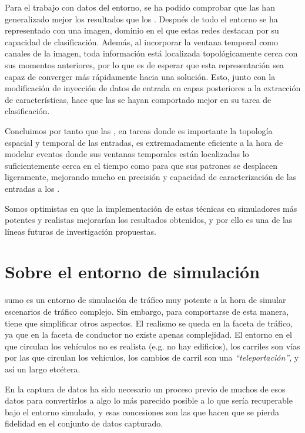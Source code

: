 Para el trabajo con datos del entorno, se ha podido comprobar que las  han generalizado mejor los resultados que los . Después de todo el entorno se ha representado con una imagen, dominio en el que estas redes destacan por su capacidad de clasificación. Además, al incorporar la ventana temporal como canales de la imagen, toda información está localizada topológicamente cerca con sus momentos anteriores, por lo que es de esperar que esta representación sea capaz de converger más rápidamente hacia una solución. Esto, junto con la modificación de inyección de datos de entrada en capas posteriores a la extracción de características, hace que las  se hayan comportado mejor en su tarea de clasificación.

Concluimos por tanto que las , en tareas donde es importante la topología espacial y temporal de las entradas, es extremadamente eficiente a la hora de modelar eventos donde sus ventanas temporales están localizadas lo suficientemente cerca en el tiempo como para que sus patrones se desplacen ligeramente, mejorando mucho en precisión y capacidad de caracterización de las entradas a los .

Somos optimistas en que la implementación de estas técnicas en simuladores más potentes y realistas mejorarían los resultados obtenidos, y por ello es una de las líneas futuras de investigación propuestas.

\section{Sobre el entorno de simulación}

\gls{sumo} es un entorno de simulación de tráfico muy potente a la hora de simular escenarios de tráfico complejo. Sin embargo, para comportarse de esta manera, tiene que simplificar otros aspectos. El realismo se queda en la faceta de tráfico, ya que en la faceta de conductor no existe apenas complejidad. El entorno en el que circulan los vehículos no es realista (e.g. no hay edificios), los carriles son vías por las que circulan los vehículos, los cambios de carril son una \textit{\enquote{teleportación}}, y así un largo etcétera.

En la captura de datos ha sido necesario un proceso previo de muchos de esos datos para convertirlos a algo lo más parecido posible a lo que sería recuperable bajo el entorno simulado, y esas concesiones son las que hacen que se pierda fidelidad en el conjunto de datos capturado.

